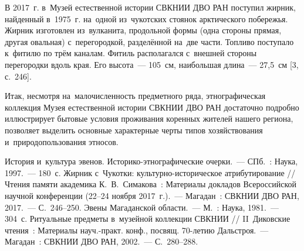 В 2017~г. в~Музей естественной истории СВКНИИ ДВО РАН поступил жирник, найденный в~1975~г. на~одной из~чукотских стоянок арктического побережья. Жирник изготовлен из~вулканита, продольной формы (одна стороны прямая, другая овальная) с~перегородкой, разделённой на~две части. Топливо поступало к~фитилю по трём каналам. Фитиль располагался с~внешней стороны перегородки вдоль края. Его высота~--- 105~см, наибольшая длина~--- 27,5~см [3, с.~246].

Итак, несмотря на~малочисленность предметного ряда, этнографическая коллекция Музея естественной истории СВКНИИ ДВО РАН достаточно подробно иллюстрирует бытовые условия проживания коренных жителей нашего региона, позволяет выделить основные характерные черты типов хозяйствования и~природопользования этносов.

\begin{thebibliography}{99}
\bibitem{}История и~культура эвенов. Историко-этнографические очерки.~--- СПб.~: Наука, 1997.~--- 180~с.
\bibitem{} Жирник с~Чукотки: культурно-историческое атрибутирование // Чтения памяти академика К.~В.~Симакова~: Материалы докладов Всероссийской научной конференции (22--24 ноября 2017~г.).~--- Магадан~: СВКНИИ ДВО РАН, 2017.~--- С.~246--250.
\bibitem{} Эвены Магаданской области.~--- М.~: Наука, 1981.~--- 304~с.
\bibitem{} Ритуальные предметы в~музейной коллекции СВКНИИ // II~Диковские чтения~: Материалы науч.-практ. конф., посвящ. 70-летию Дальстроя.~--- Магадан~: СВКНИИ ДВО РАН, 2002.~--- С.~280--288.

\end{thebibliography}
